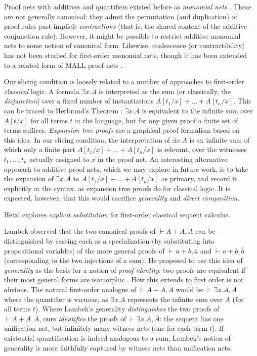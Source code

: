 \documentclass[UKenglish]{lipics-v2019}
\newcommand\+{+}
\renewcommand\*{\times}
\newcommand\dual[1]{\overline{#1}}
\newcommand\seq[2]{{\vdash}#1,#2}
\begin{document}
Proof nets with additives and quantifiers existed before as \emph{monomial nets} \cite{Girard-1996}. These are not generally canonical: they admit the permutation (and duplication) of proof rules past implicit \emph{contractions} (that is, the shared context of the additive conjunction rule). However, it might be possible to restrict additive monomial nets to some notion of canonical form. Likewise, coalescence (or contractibility) has not been studied for first-order monomial nets, though it has been extended to a related form of MALL proof nets \cite{Maieli-2007}.

Our slicing condition is loosely related to a number of approaches to first-order \emph{classical} logic. A formula $\exists x.A$ is interpreted as the sum (or classically, the \emph{disjunction}) over a fixed number of instantiations $A[t_1/x]\+\dots\+A[t_n/x]$. This can be traced to Herbrand's Theorem \cite{Herbrand-1930}: $\exists x.A$ is equivalent to the infinite sum over $A[t/x]$ for all terms $t$ in the language, but for any given proof a finite set of terms suffices. \emph{Expansion tree proofs} \cite{Miller-1987,Heijltjes-2010} are a graphical proof formalism based on this idea. In our slicing condition, the interpretation of $\exists x.A$ is an infinite sum of which only a finite part $A[t_1/x]\+\dots\+A[t_n/x]$ is relevant, over the witnesses $t_1,\dots,t_n$ actually assigned to $x$ in the proof net. An interesting alternative approach to additive proof nets, which we may explore in future work, is to take the expansion of $\exists x.A$ to $A[t_1/x]\+\dots\+A[t_n/x]$ as primary, and record it explicitly in the syntax, as expansion tree proofs do for classical logic. It is expected, however, that this would sacrifice \emph{generality} and \emph{direct composition}.

Hetzl \cite{Hetzl-2010} explores \emph{explicit substitution} for first-order classical sequent calculus.

Lambek observed that the two canonical proofs of $\seq{A{\+}A}{\dual A}$ can be distinguished by casting each as a specialization (by substituting into propositional variables) of the more general proofs of $\seq{\,a{\+}b}{\dual a}$ and $\seq{\,a{\+}b}{\dual b}$ (corresponding to the two injections of a sum). He proposed to use this idea of \emph{generality} as the basis for a notion of \emph{proof identity}: two proofs are equivalent if their most general forms are isomorphic \cite{Lambek-1968-1972}. How this extends to first order is not obvious. The natural first-order analogue of $\seq{A{\+}A}{\dual A}$ would be $\seq{\exists x.A}{\dual A}$ where the quantifier is vacuous, as $\exists x.A$ represents the infinite sum over $A$ (for all terms $t$). Where Lambek's generality \emph{distinguishes} the two proofs of $\seq{A{\+}A}{\dual A}$, ours \emph{identifies} the proofs of $\seq{\exists x.A}{\dual A}$: the sequent has one unification net, but infinitely many witness nets (one for each term $t$). If existential quantification is indeed analogous to a sum, Lambek's notion of generality is more faithfully captured by witness nets than unification nets.
\end{document}
